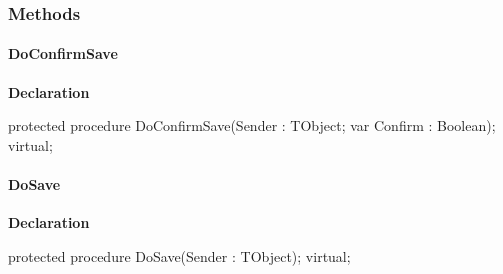 \documentclass{report}
\newif\ifpdf
\begin{document}
\subsubsection*{\large{\textbf{Methods}}\normalsize\hspace{1ex}\hfill}
\paragraph*{DoConfirmSave}\hspace*{\fill}

\label{AbZipper.TAbCustomZipper-DoConfirmSave}
\begin{list}{}{
\setlength{\itemindent}{0cm}
\setlength{\listparindent}{0cm}
\setlength{\leftmargin}{\evensidemargin}
\addtolength{\leftmargin}{\tmplength}
\settowidth{\labelsep}{X}
\addtolength{\leftmargin}{\labelsep}
\setlength{\labelwidth}{\tmplength}
}
\item[\textbf{Declaration}\hfill]
\ifpdf
\begin{flushleft}
\fi
\begin{ttfamily}
protected procedure DoConfirmSave(Sender : TObject; var Confirm : Boolean); virtual;\end{ttfamily}

\ifpdf
\end{flushleft}
\fi

\end{list}
\paragraph*{DoSave}\hspace*{\fill}

\label{AbZipper.TAbCustomZipper-DoSave}
\begin{list}{}{
\setlength{\itemindent}{0cm}
\setlength{\listparindent}{0cm}
\setlength{\leftmargin}{\evensidemargin}
\addtolength{\leftmargin}{\tmplength}
\settowidth{\labelsep}{X}
\addtolength{\leftmargin}{\labelsep}
\setlength{\labelwidth}{\tmplength}
}
\item[\textbf{Declaration}\hfill]
\ifpdf
\begin{flushleft}
\fi
\begin{ttfamily}
protected procedure DoSave(Sender : TObject); virtual;\end{ttfamily}

\ifpdf
\end{flushleft}
\fi

\end{list}
\end{document}
